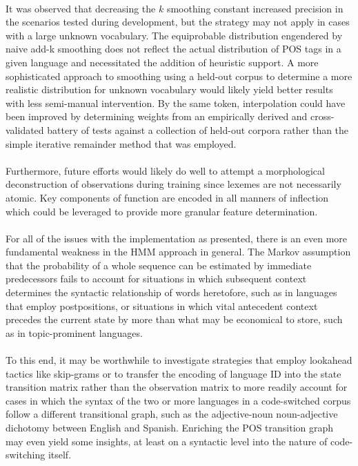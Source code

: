 \documentclass[11pt,a4paper]{article}
\begin{document}
\paragraph{}
It was observed that decreasing the $k$ smoothing constant increased
precision in the scenarios tested during development, but the strategy
may not apply in cases with a large unknown vocabulary. The equiprobable
distribution engendered by naive add-k smoothing does not reflect the actual
distribution of POS tags in a given language and necessitated the addition
of heuristic support. A more sophisticated approach to smoothing using a held-out
corpus to determine a more realistic distribution for unknown vocabulary
would likely yield better results with less semi-manual intervention.
By the same token, interpolation could have been improved by determining weights
from an empirically derived and cross-validated battery of tests against a collection
of held-out corpora rather than the simple iterative remainder method that was employed.

\paragraph{}
Furthermore, future efforts would likely do well to attempt a morphological deconstruction
of observations during training since lexemes are not necessarily atomic. Key components
of function are encoded in all manners of inflection which could be leveraged to provide
more granular feature determination.

\paragraph{}
For all of the issues with the implementation as presented, there is an even more
fundamental weakness in the HMM approach in general. The Markov assumption that
the probability of a whole sequence can be estimated by immediate predecessors
fails to account for situations in which subsequent context determines the syntactic
relationship of words heretofore, such as in languages that employ postpositions,
or situations in which vital antecedent context precedes the current state by more
than what may be economical to store, such as in topic-prominent languages.

\paragraph{}
To this end, it may be worthwhile to investigate strategies that employ lookahead tactics
like skip-grams or to transfer the encoding of language ID into the state transition matrix
rather than the observation matrix to more readily account for cases in which the syntax of
the two or more languages in a code-switched corpus follow a different transitional graph,
such as the adjective-noun noun-adjective dichotomy between English and Spanish.
Enriching the POS transition graph may even yield some insights, at least on a syntactic
level into the nature of code-switching itself.
\end{document}
